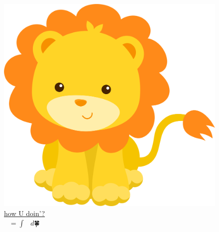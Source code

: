 	\thispagestyle{empty}
	\begin{figure}
		\centering
		\includegraphics[width=0.81\paperwidth]{img/lion.png}
		\caption*{\href{https://github.com/How-u-doing}{how U doin'?}
			\\ $🐳^{🐳^{🐳}} = ∫_{🎃}^{🎅} 🐑 \ d🍀$ }
		\label{cover:lion}
	\end{figure}
	\pagecolor{pink}
	\afterpage{\nopagecolor}
	\clearpage